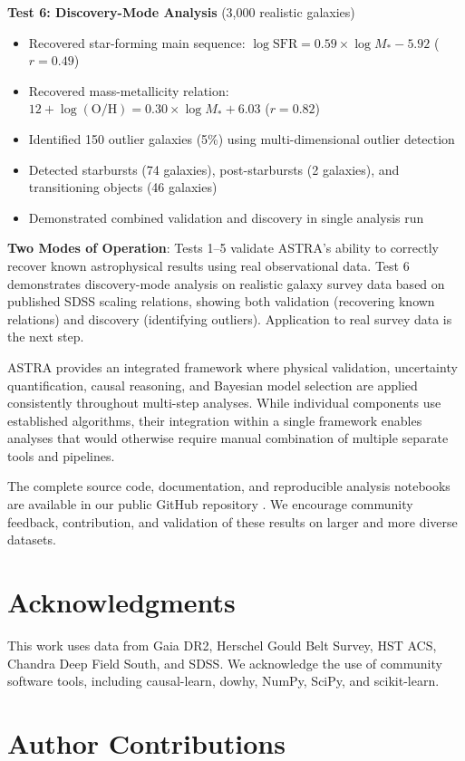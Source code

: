 \documentclass[usenatbib]{rasti}
\begin{document}
\textbf{Test 6: Discovery-Mode Analysis} (3,000 realistic galaxies)
\begin{itemize}
\item Recovered star-forming main sequence: $\log \text{SFR} = 0.59 \times \log M_* - 5.92$ ($r = 0.49$)
\item Recovered mass-metallicity relation: $12 + \log(\text{O/H}) = 0.30 \times \log M_* + 6.03$ ($r = 0.82$)
\item Identified 150 outlier galaxies (5\%) using multi-dimensional outlier detection
\item Detected starbursts (74 galaxies), post-starbursts (2 galaxies), and transitioning objects (46 galaxies)
\item Demonstrated combined validation and discovery in single analysis run
\end{itemize}

\textbf{Two Modes of Operation}: Tests 1--5 validate ASTRA's ability to correctly recover known astrophysical results using real observational data. Test 6 demonstrates discovery-mode analysis on realistic galaxy survey data based on published SDSS scaling relations, showing both validation (recovering known relations) and discovery (identifying outliers). Application to real survey data is the next step.

ASTRA provides an integrated framework where physical validation, uncertainty quantification, causal reasoning, and Bayesian model selection are applied consistently throughout multi-step analyses. While individual components use established algorithms, their integration within a single framework enables analyses that would otherwise require manual combination of multiple separate tools and pipelines.

The complete source code, documentation, and reproducible analysis notebooks are available in our public GitHub repository \cite{astra_github}. We encourage community feedback, contribution, and validation of these results on larger and more diverse datasets.

\section*{Acknowledgments}

This work uses data from Gaia DR2, Herschel Gould Belt Survey, HST ACS, Chandra Deep Field South, and SDSS. We acknowledge the use of community software tools, including causal-learn, dowhy, NumPy, SciPy, and scikit-learn.

\section*{Author Contributions}
\end{document}
